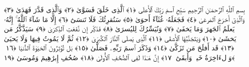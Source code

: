 
  
    
  
    
    

\nopagebreak
  بِسمِ ٱللَّهِ ٱلرَّحمَـٰنِ ٱلرَّحِيمِ
  سَبِّحِ ٱسمَ رَبِّكَ ٱلأَعلَى ﴿١﴾
 ٱلَّذِى خَلَقَ فَسَوَّىٰ ﴿٢﴾
 وَٱلَّذِى قَدَّرَ فَهَدَىٰ ﴿٣﴾
 وَٱلَّذِىٓ أَخرَجَ ٱلمَرعَىٰ ﴿٤﴾
 فَجَعَلَهُۥ غُثَآءً أَحوَىٰ ﴿٥﴾
 سَنُقرِئُكَ فَلَا تَنسَىٰٓ ﴿٦﴾
 إِلَّا مَا شَآءَ ٱللَّهُ ۚ إِنَّهُۥ يَعلَمُ ٱلجَهرَ وَمَا يَخفَىٰ ﴿٧﴾
 وَنُيَسِّرُكَ لِليُسرَىٰ ﴿٨﴾
 فَذَكِّر إِن نَّفَعَتِ ٱلذِّكرَىٰ ﴿٩﴾
 سَيَذَّكَّرُ مَن يَخشَىٰ ﴿١٠﴾
 وَيَتَجَنَّبُهَا ٱلأَشقَى ﴿١١﴾
 ٱلَّذِى يَصلَى ٱلنَّارَ ٱلكُبرَىٰ ﴿١٢﴾
 ثُمَّ لَا يَمُوتُ فِيهَا وَلَا يَحيَىٰ ﴿١٣﴾
 قَد أَفلَحَ مَن تَزَكَّىٰ ﴿١٤﴾
 وَذَكَرَ ٱسمَ رَبِّهِۦ فَصَلَّىٰ ﴿١٥﴾
 بَل تُؤثِرُونَ ٱلحَيَوٰةَ ٱلدُّنيَا ﴿١٦﴾
 وَٱلءَاخِرَةُ خَيرٌۭ وَأَبقَىٰٓ ﴿١٧﴾
 إِنَّ هَـٰذَا لَفِى ٱلصُّحُفِ ٱلأُولَىٰ ﴿١٨﴾
 صُحُفِ إِبرَٰهِيمَ وَمُوسَىٰ ﴿١٩﴾
 
